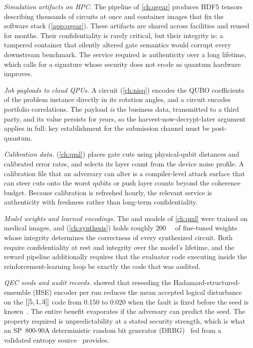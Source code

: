 \emph{Simulation artifacts on HPC.} The \qgear{} pipeline of \cref{ch:qgear} produces HDF5 tensors describing thousands of circuits at once and container images that fix the software stack (\cref{app:qgear}). These artifacts are shared across facilities and reused for months. Their confidentiality is rarely critical, but their integrity is: a tampered container that silently altered gate semantics would corrupt every downstream benchmark. The service required is authenticity over a long lifetime, which calls for a signature whose security does not erode as quantum hardware improves.

\emph{Job payloads to cloud QPUs.} A \deal{} circuit (\cref{ch:nisq}) encodes the QUBO coefficients of the problem instance directly in its rotation angles, and a \qawa{} circuit encodes portfolio correlations. The payload \emph{is} the business data, transmitted to a third party, and its value persists for years, so the harvest-now-decrypt-later argument applies in full: key establishment for the submission channel must be post-quantum.

\emph{Calibration data.} \shardq{} (\cref{ch:qml}) places gate cuts using physical-qubit distances and calibrated error rates, and \deal{} selects its layer count from the device noise profile. A calibration file that an adversary can alter is a compiler-level attack surface that can steer cuts onto the worst qubits or push layer counts beyond the coherence budget. Because calibration is refreshed hourly, the relevant service is authenticity with freshness rather than long-term confidentiality.

\emph{Model weights and learned encodings.} The \qpie{} and \vqt{} models of \cref{ch:qml} were trained on medical images, and \rubriq{} (\cref{ch:synthesis}) holds roughly \SI{200}{\giga\byte} of fine-tuned weights whose integrity determines the correctness of every synthesized circuit. Both require confidentiality at rest and integrity over the model's lifetime, and the \rubriq{} reward pipeline additionally requires that the evaluator code executing inside the reinforcement-learning loop be exactly the code that was audited.

\emph{QEC seeds and audit records.}  showed that reseeding the Hadamard-structured-ensemble (HSE) encoder per run reduces the mean accepted logical disturbance on the $[[5,1,3]]$ code from 0.150 to 0.020 when the fault is fixed before the seed is known~\cite{guo2026qecaudit}. The entire benefit evaporates if the adversary can predict the seed. The property required is unpredictability at a stated security strength, which is what an SP~800-90A deterministic random bit generator (DRBG)~\cite{nist2015sp80090a} fed from a validated entropy source~\cite{nist2018sp80090b} provides.

